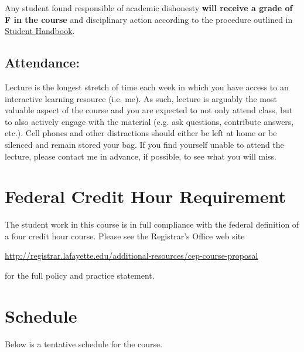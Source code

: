 \documentclass[12pt]{amsart}
\begin{document}
Any student found responsible of academic dishonesty \textbf{will receive a grade of F in the course} and disciplinary action according to the procedure outlined in \href{https://conduct.lafayette.edu/wp-content/uploads/sites/93/2018/08/StudentHandboook-2018-19.pdf}{Student Handbook}.

\subsection*{Attendance:}
Lecture is the longest stretch of time each week in which you have access to an interactive learning resource (i.e. me).
As such, lecture is arguably the most valuable aspect of the course and you are expected to not only attend class, but to also actively engage with the material (e.g. ask questions, contribute answers, etc.).
Cell phones and other distractions should either be left at home or be silenced and remain stored your bag.
If you find yourself unable to attend the lecture, please contact me in advance, if possible, to see what you will miss.

\section*{Federal Credit Hour Requirement}
The student work in this course is in full compliance with the federal definition of a four credit hour course.
Please see the Registrar's Office web site

\begin{center}
  \url{http://registrar.lafayette.edu/additional-resources/cep-course-proposal}
\end{center}
for the full policy and practice statement.

\section*{Schedule}
Below is a tentative schedule for the course.

\end{document}
